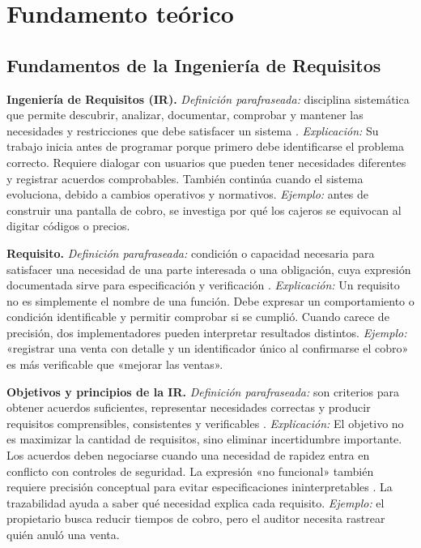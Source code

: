 \documentclass[onecolumn,12pt,a4paper]{IEEEtran}
\begin{document}
\setcounter{section}{1}
\section{Fundamento teórico}

\subsection{Fundamentos de la Ingeniería de Requisitos}

\textbf{Ingeniería de Requisitos (IR).} \emph{Definición parafraseada:} disciplina sistemática que permite descubrir, analizar, documentar, comprobar y mantener las necesidades y restricciones que debe satisfacer un sistema \cite{iso29148,pohl2025}. \emph{Explicación:} Su trabajo inicia antes de programar porque primero debe identificarse el problema correcto. Requiere dialogar con usuarios que pueden tener necesidades diferentes y registrar acuerdos comprobables. También continúa cuando el sistema evoluciona, debido a cambios operativos y normativos. \emph{Ejemplo:} antes de construir una pantalla de cobro, se investiga por qué los cajeros se equivocan al digitar códigos o precios.

\textbf{Requisito.} \emph{Definición parafraseada:} condición o capacidad necesaria para satisfacer una necesidad de una parte interesada o una obligación, cuya expresión documentada sirve para especificación y verificación \cite{iso29148,pohl2025}. \emph{Explicación:} Un requisito no es simplemente el nombre de una función. Debe expresar un comportamiento o condición identificable y permitir comprobar si se cumplió. Cuando carece de precisión, dos implementadores pueden interpretar resultados distintos. \emph{Ejemplo:} «registrar una venta con detalle y un identificador único al confirmarse el cobro» es más verificable que «mejorar las ventas».

\textbf{Objetivos y principios de la IR.} \emph{Definición parafraseada:} son criterios para obtener acuerdos suficientes, representar necesidades correctas y producir requisitos comprensibles, consistentes y verificables \cite{pohl2025,ireb2023,iso29148}. \emph{Explicación:} El objetivo no es maximizar la cantidad de requisitos, sino eliminar incertidumbre importante. Los acuerdos deben negociarse cuando una necesidad de rapidez entra en conflicto con controles de seguridad. La expresión «no funcional» también requiere precisión conceptual para evitar especificaciones ininterpretables \cite{glinz2007}. La trazabilidad ayuda a saber qué necesidad explica cada requisito. \emph{Ejemplo:} el propietario busca reducir tiempos de cobro, pero el auditor necesita rastrear quién anuló una venta.
\end{document}
